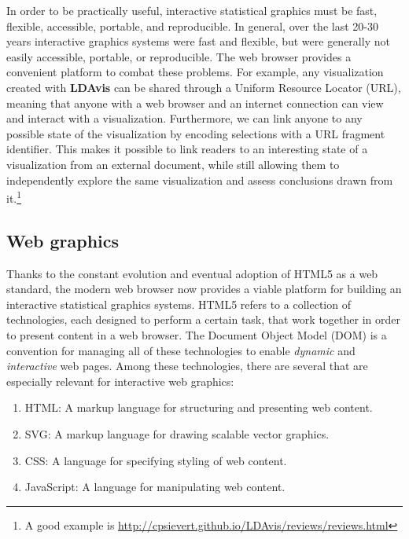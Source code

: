 \documentclass[12pt,]{isuthesis}
\providecommand{\tightlist}{%
  \setlength{\itemsep}{0pt}\setlength{\parskip}{0pt}}
\let\rmarkdownfootnote\footnote%
\def\footnote{\protect\rmarkdownfootnote}
\begin{document}
In order to be practically useful, interactive statistical graphics must
be fast, flexible, accessible, portable, and reproducible. In general,
over the last 20-30 years interactive graphics systems were fast and
flexible, but were generally not easily accessible, portable, or
reproducible. The web browser provides a convenient platform to combat
these problems. For example, any visualization created with
\textbf{LDAvis} can be shared through a Uniform Resource Locator (URL),
meaning that anyone with a web browser and an internet connection can
view and interact with a visualization. Furthermore, we can link anyone
to any possible state of the visualization by encoding selections with a
URL fragment identifier. This makes it possible to link readers to an
interesting state of a visualization from an external document, while
still allowing them to independently explore the same visualization and
assess conclusions drawn from it.\footnote{A good example is
  \url{http://cpsievert.github.io/LDAvis/reviews/reviews.html}}

\subsection{Web graphics}\label{web-graphics}

Thanks to the constant evolution and eventual adoption of HTML5 as a web
standard, the modern web browser now provides a viable platform for
building an interactive statistical graphics systems. HTML5 refers to a
collection of technologies, each designed to perform a certain task,
that work together in order to present content in a web browser. The
Document Object Model (DOM) is a convention for managing all of these
technologies to enable \emph{dynamic} and \emph{interactive} web pages.
Among these technologies, there are several that are especially relevant
for interactive web graphics:

\begin{enumerate}
\def\labelenumi{\arabic{enumi}.}
\tightlist
\item
  HTML: A markup language for structuring and presenting web content.
\item
  SVG: A markup language for drawing scalable vector graphics.
\item
  CSS: A language for specifying styling of web content.
\item
  JavaScript: A language for manipulating web content.
\end{enumerate}
\end{document}
